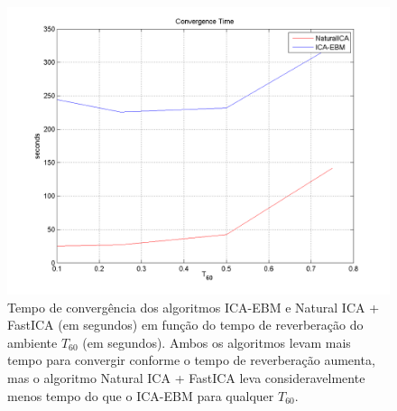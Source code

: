       
\begin{figure}
    \centering
        \includegraphics[scale=0.8]{figuras/comparison_convergence_ts.png}
            \caption{Tempo de convergência dos algoritmos ICA-EBM e Natural ICA + FastICA (em segundos) em função do tempo de reverberação do ambiente $T_{60}$ (em segundos). Ambos os algoritmos levam mais tempo para convergir conforme o tempo de reverberação aumenta, mas o algoritmo Natural ICA + FastICA leva consideravelmente menos tempo do que o ICA-EBM para qualquer $T_{60}$.}
    \label{fig:comparison_convergence_ts}
\end{figure}



